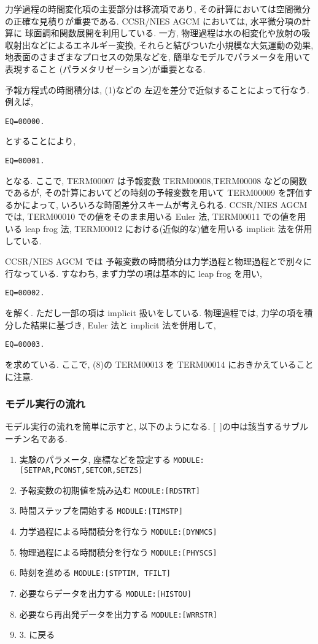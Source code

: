 力学過程の時間変化項の主要部分は移流項であり,
その計算においては空間微分の正確な見積りが重要である.
CCSR/NIES AGCM においては, 水平微分項の計算に
球面調和関数展開を利用している.
一方, 物理過程は水の相変化や放射の吸収射出などによるエネルギー変換, 
それらと結びついた小規模な大気運動の効果, 
地表面のさまざまなプロセスの効果などを, 
簡単なモデルでパラメータを用いて表現すること
(パラメタリゼーション)が重要となる.

予報方程式の時間積分は,
(1)などの
左辺を差分で近似することによって行なう. 例えば,
%
\begin{verbatim}
EQ=00000.
\end{verbatim}
%
とすることにより, 
\begin{verbatim}
EQ=00001.
\end{verbatim}
となる. 
ここで, TERM00007 は予報変数 TERM00008,TERM00008 などの関数であるが,
その計算においてどの時刻の予報変数を用いて TERM00009 を評価するかによって,
いろいろな時間差分スキームが考えられる.
CCSR/NIES AGCM では, 
TERM00010 での値をそのまま用いる Euler 法,
TERM00011 での値を用いる leap frog 法, 
TERM00012 における(近似的な)値を用いる implicit 法を併用している.

CCSR/NIES AGCM では
予報変数の時間積分は力学過程と物理過程とで別々に行なっている.
すなわち, まず力学の項は基本的に leap frog を用い,
\begin{verbatim}
EQ=00002.
\end{verbatim}
を解く. ただし一部の項は implicit 扱いをしている.
物理過程では,
力学の項を積分した結果に基づき, 
Euler 法と implicit 法を併用して,
\begin{verbatim}
EQ=00003.
\end{verbatim}
を求めている. 
ここで, (8)の TERM00013 を
TERM00014 におきかえていることに注意.

\subsubsection{モデル実行の流れ}

モデル実行の流れを簡単に示すと, 以下のようになる.
[\ ]の中は該当するサブルーチン名である.

\begin{enumerate}
\item 実験のパラメータ, 座標などを設定する \texttt{MODULE:[SETPAR,PCONST,SETCOR,SETZS]}
\item 予報変数の初期値を読み込む \texttt{MODULE:[RDSTRT]}
\item 時間ステップを開始する \texttt{MODULE:[TIMSTP]}
\item 力学過程による時間積分を行なう \texttt{MODULE:[DYNMCS]}
\item 物理過程による時間積分を行なう \texttt{MODULE:[PHYSCS]}
\item 時刻を進める \texttt{MODULE:[STPTIM, TFILT]}
\item 必要ならデータを出力する \texttt{MODULE:[HISTOU]}
\item 必要なら再出発データを出力する \texttt{MODULE:[WRRSTR]}
\item 3. に戻る
\end{enumerate}


